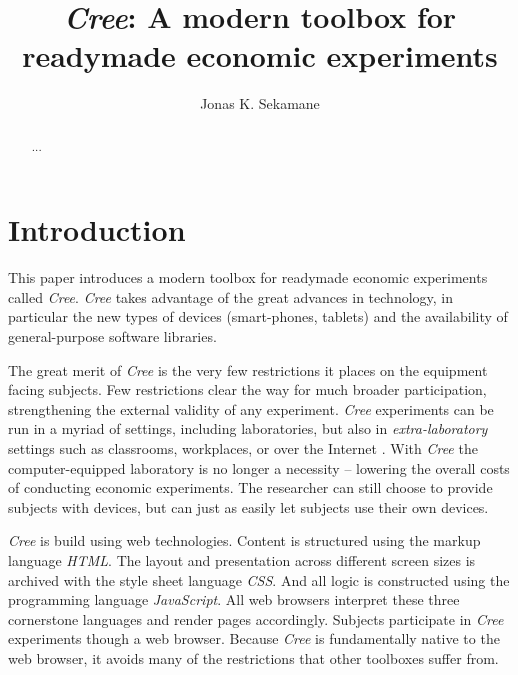 \documentclass[preprint, 12pt]{elsarticle}
\newcommand{\Cree}{\emph{Cree}\xspace}
\begin{document}
\begin{frontmatter}

\title{\emph{Cree}: A modern toolbox for readymade economic experiments}
\author{Jonas K. Sekamane}
\address{{\color{red} First draft}}

\begin{abstract}
{\color{red} ...}
\end{abstract}

\end{frontmatter}


\section{Introduction}
\label{S:Introduction}

This paper introduces a modern toolbox for readymade economic experiments called \Cree. \Cree takes advantage of the great advances in technology, in particular the new types of devices (smart-phones, tablets) and the availability of general-purpose software libraries. 

The great merit of \Cree is the very few restrictions it places on the equipment facing subjects. Few restrictions clear the way for much broader participation, strengthening the external validity of any experiment. \Cree experiments can be run in a myriad of settings, including laboratories, but also in \emph{extra-laboratory} settings such as classrooms, workplaces, or over the Internet \citep{Charness_Gneezy_Kuhn_2013}. With \Cree the computer-equipped laboratory is no longer a necessity -- lowering the overall costs of conducting economic experiments. The researcher can still choose to provide subjects with devices, but can just as easily let subjects use their own devices. 

\Cree is build using web technologies. Content is structured using the markup language \emph{HTML}. The layout and presentation across different screen sizes is archived with the style sheet language \emph{CSS}. And all logic is constructed using the programming language \emph{JavaScript}. All web browsers interpret these three cornerstone languages and render pages accordingly. Subjects participate in \Cree experiments though a web browser. Because \Cree is fundamentally native to the web browser, it avoids many of the restrictions that other toolboxes suffer from.
\end{document}
